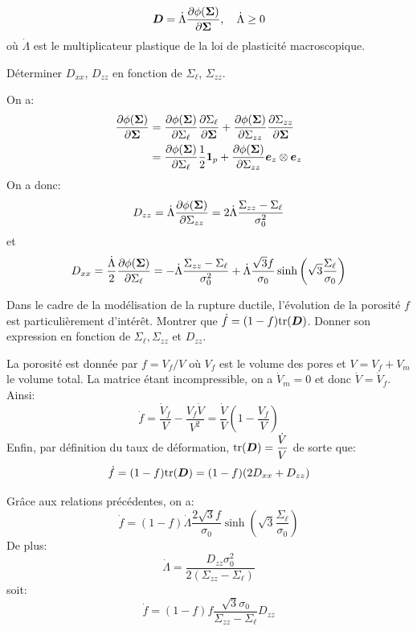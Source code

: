 \documentclass[french,12pt]{exam}
\begin{document}
\begin{questions}
  \begin{equation}
     \boldsymbol{D} = \dot{\Lambda} \frac{\partial \phi(\boldsymbol{\Sigma})}{\partial \boldsymbol{\Sigma}},  \quad \dot{\Lambda}\geq 0
  \end{equation}
où $\dot{\Lambda}$ est le multiplicateur plastique de la loi de plasticité macroscopique.

\question Déterminer $D_{xx}$, $D_{zz}$ en fonction de $\Sigma_\ell$, $\Sigma_{zz}$.
 \begin{solution}
 On a:
\begin{align*}
\frac{\partial \phi(\boldsymbol{\Sigma})}{\partial \boldsymbol{\Sigma}} &= \frac{\partial \phi(\boldsymbol{\Sigma})}{\partial \Sigma_\ell}\frac{\partial \Sigma_\ell}{\partial \boldsymbol{\Sigma}} + \frac{\partial \phi(\boldsymbol{\Sigma})}{\partial \Sigma_{zz}}\frac{\partial \Sigma_{zz}}{\partial \boldsymbol{\Sigma}}\\
 &= \frac{\partial \phi(\boldsymbol{\Sigma})}{\partial \Sigma_\ell}\dfrac{1}{2}\boldsymbol{1}_p + \frac{\partial \phi(\boldsymbol{\Sigma})}{\partial \Sigma_{zz}}\boldsymbol{e}_z\otimes\boldsymbol{e}_z
\end{align*}
On a donc:
 $$D_{zz} = \dot{\Lambda}\dfrac{\partial \phi(\boldsymbol{\Sigma})}{\partial \Sigma_{zz}} = 2\dot{\Lambda}\dfrac{\Sigma_{zz}-\Sigma_\ell}{\sigma_0^2}$$
et
$$D_{xx} = \dfrac{\dot{\Lambda}}{2}\dfrac{\partial \phi(\boldsymbol{\Sigma})}{\partial \Sigma_\ell} = -\dot{\Lambda}\dfrac{\Sigma_{zz}-\Sigma_\ell}{\sigma_0^2} +  \dot{\Lambda}\dfrac{\sqrt{3}f}{\sigma_0} \sinh{\left(  \sqrt{3} \frac{\Sigma_\ell}{\sigma_0} \right)} $$
 \end{solution} 


 \question Dans le cadre de la modélisation de la rupture ductile, l'évolution de la porosité $f$ est particulièrement d'intérêt. Montrer que $\dot{f} = (1 - f) \mathrm{tr} (\boldsymbol{D})$. Donner son expression en fonction de $\Sigma_\ell,\Sigma_{zz}$ et $D_{zz}$.
\begin{solution}
La porosité est donnée par $f=V_f/V$ où $V_f$ est le volume des pores et $V=V_f+V_m$ le volume total. La matrice étant incompressible, on a $\dot{V}_m=0$ et donc $\dot{V}=\dot{V}_f$. Ainsi:
$$\dot{f} = \dfrac{\dot{V}_f}{V}-\dfrac{V_f\dot{V}}{V^2} = \dfrac{\dot{V}}{V}\left(1-\dfrac{V_f}{V}\right)$$
Enfin, par définition du taux de déformation, $\mathrm{tr}( \boldsymbol{D}) =  \dfrac{\dot{V}}{V}$ de sorte que:
$$\dot{f}=(1-f)\mathrm{tr}(\boldsymbol{D}) = (1-f)(2D_{xx}+D_{zz})$$

Grâce aux relations précédentes, on a:
$$\dot{f} = (1-f)\dot{\Lambda}\dfrac{2\sqrt{3}f}{\sigma_0} \sinh{\left(  \sqrt{3} \frac{\Sigma_\ell}{\sigma_0} \right)} $$
De plus:
$$\dot{\Lambda}= \dfrac{D_{zz}\sigma_0^2}{2(\Sigma_{zz}-\Sigma_\ell)}$$
soit:
$$\dot{f} = (1-f)f\dfrac{\sqrt{3}\sigma_0}{\Sigma_{zz}-\Sigma_\ell}D_{zz}$$
\end{solution}
\end{questions}
\end{document}
